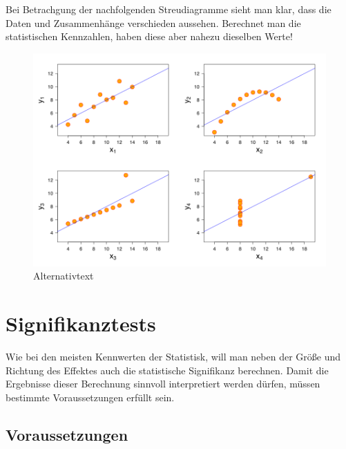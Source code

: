 \documentclass[
]{article}
\begin{document}
Bei Betrachgung der nachfolgenden Streudiagramme sieht man klar, dass die Daten und Zusammenhänge verschieden aussehen. Berechnet man die statistischen Kennzahlen, haben diese aber nahezu dieselben Werte!

\begin{figure}
\centering
\includegraphics{images/Anscombe-Quartet.png}
\caption{Alternativtext}
\end{figure}

\section*{Signifikanztests}\label{signifikanztests}

Wie bei den meisten Kennwerten der Statistisk, will man neben der Größe und Richtung des Effektes auch die statistische Signifikanz berechnen. Damit die Ergebnisse dieser Berechnung sinnvoll interpretiert werden dürfen, müssen bestimmte Voraussetzungen erfüllt sein.

\subsection*{Voraussetzungen}\label{voraussetzungen}
\end{document}
